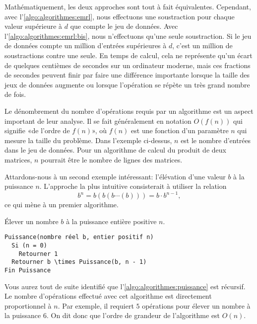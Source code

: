 Mathématiquement, les deux approches sont tout à fait équivalentes.
Cependant, avec l'\autoref{algo:algorithmes:emrl}, nous effectuons une
soustraction pour chaque valeur supérieure à $d$ que compte le jeu de
données. Avec l'\autoref{algo:algorithmes:emrl:bis}, nous n'effectuons
qu'une seule soustraction. Si le jeu de données compte un million
d'entrées supérieures à $d$, c'est un million de soustractions contre
une seule. En temps de calcul, cela ne représente qu'un écart de
quelques centièmes de secondes sur un ordinateur moderne, mais ces
fractions de secondes peuvent finir par faire une différence
importante lorsque la taille des jeux de données augmente ou lorsque
l'opération se répète un très grand nombre de fois.

Le dénombrement du nombre d'opérations requis par un algorithme est un
aspect important de leur analyse. Il se fait généralement en notation
$O(f(n))$ qui signifie «de l'ordre de $f(n)$», où $f(n)$ est une
fonction d'un paramètre $n$ qui mesure la taille du problème. Dans
l'exemple ci-dessus, $n$ est le nombre d'entrées dans le jeu de
données. Pour un algorithme de calcul du produit de deux matrices, $n$
pourrait être le nombre de lignes des matrices.

Attardons-nous à un second exemple intéressant: l'élévation d'une
valeur $b$ à la puissance $n$. L'approche la plus intuitive
consisterait à utiliser la relation
\begin{equation*}
  b^n = b (b (b \cdots (b))) = b \cdot b^{n - 1},
\end{equation*}
ce qui mène à un premier algorithme.

\begin{algorithme}
  \label{algo:algorithmes:puissance}
  Élever un nombre $b$ à la puissance entière positive $n$.
  \begin{Schunk}
\begin{Verbatim}[commandchars=\\\{\}]
Puissance(nombre réel b, entier positif n)
  Si (n = 0)
    Retourner 1
  Retourner b \times Puissance(b, n - 1)
Fin Puissance
\end{Verbatim}
  \end{Schunk}
\end{algorithme}

Vous aurez tout de suite identifié que
l'\autoref{algo:algorithmes:puissance} est récursif. Le nombre
d'opérations effectué avec cet algorithme est directement
proportionnel à $n$. Par exemple, il requiert $5$ opérations pour
élever un nombre à la puissance $6$. On dit donc que l'ordre de
grandeur de l'algorithme est $O(n)$.

